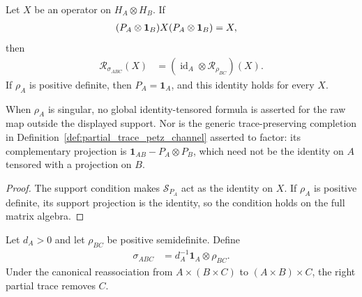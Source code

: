 \begin{theorem}
    \label{thm:entropy_petz_product_tensor_corollaries}
    \leanok
    Let $X$ be an operator on $H_A\otimes H_B$. If
    \begin{align}
        (P_A\otimes\mathbf 1_B)X(P_A\otimes\mathbf 1_B)
        &=X,
        \notag
    \end{align}
    then
    \begin{align}
        \mathcal R_{\sigma_{ABC}}(X)
        &=(\operatorname{id}_A\otimes
          \mathcal R_{\rho_{BC}})(X).
        \label{eq:entropy_hjpw_product_supported}
    \end{align}
    If $\rho_A$ is positive definite, then $P_A=\mathbf 1_A$, and this
    identity holds for every $X$.

    When $\rho_A$ is singular, no global identity-tensored formula is asserted
    for the raw map outside the displayed support. Nor is the generic
    trace-preserving completion in
    Definition~\ref{def:partial_trace_petz_channel} asserted to factor: its
    complementary projection is
    $\mathbf 1_{AB}-P_A\otimes P_B$, which need not be the identity on $A$
    tensored with a projection on $B$.
\end{theorem}

\begin{proof}\leanok
    The support condition makes $\mathcal S_{P_A}$ act as the identity on
    $X$. If $\rho_A$ is positive definite, its support projection is the
    identity, so the condition holds on the full matrix algebra.
\end{proof}

\begin{definition}
    \label{def:entropy_maximally_mixed_tensor_reference}
    \leanok
    Let $d_A>0$ and let $\rho_{BC}$ be positive semidefinite. Define
    \begin{align}
        \sigma_{ABC}
        &=d_A^{-1}\mathbf 1_A\otimes\rho_{BC}.
        \label{eq:entropy_hjpw_product_reference}
    \end{align}
    Under the canonical reassociation from $A\times(B\times C)$ to
    $(A\times B)\times C$, the right partial trace removes $C$.
\end{definition}

